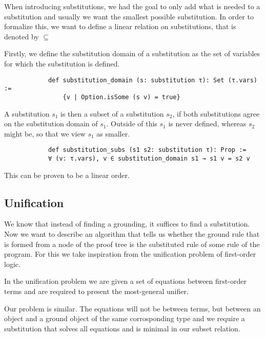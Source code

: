 \documentclass{article}
\begin{document}
            When introducing substitutions, we had the goal to only add what is needed to a substitution and usually we want the smallest possible substitution. In order to formalize this, we want to define a linear relation on substitutions, that is denoted by $\subseteq$

            Firstly, we define the substitution domain of a substitution as the set of variables for which the substitution is defined. 

            \begin{lstlisting}
            def substitution_domain (s: substitution τ): Set (τ.vars) := 
                {v | Option.isSome (s v) = true}
            \end{lstlisting}

            A substitution $s_1$ is then a subset of a substitution $s_2$, if both substitutions agree on the substitution domain of $s_1$. Outside of this $s_1$ is never defined, whereas $s_2$ might be, so that we view $s_1$ as smaller.

            \begin{lstlisting}
            def substitution_subs (s1 s2: substitution τ): Prop :=
            ∀ (v: τ.vars), v ∈ substitution_domain s1 → s1 v = s2 v
            \end{lstlisting}

            This can be proven to be a linear order.

        \subsection{Unification}

        We know that instead of finding a grounding, it suffices to find a substitution. Now we want to describe an algorithm that tells us whether the ground rule that is formed from a node of the proof tree is the substituted rule of some rule of the program. For this we take inspiration from the unification problem of first-order logic.

        In the unification problem we are given a set of equations between first-order terms and are required to present the most-general unifier.

        Our problem is similar. The equations will not be between terms, but between an object and a ground object of the same corrosponding type and we require a substitution that solves all equations and is minimal in our subset relation.
\end{document}
